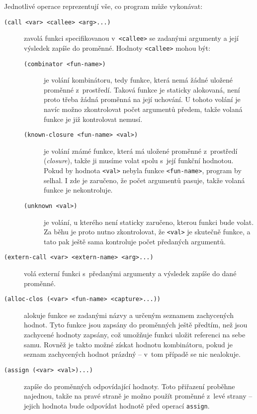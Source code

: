 Jednotlivé operace reprezentují vše, co program může vykonávat:

\begin{description}
  \item[\texttt{(call <var> <callee> <arg>...)}] zavolá funkci specifikovanou
    v~\texttt{<callee>} se zadanými argumenty a její výsledek zapíše do proměnné.
    Hodnoty \texttt{<callee>} mohou být:
    \begin{description}
      \item[\texttt{(combinator <fun-name>)}] je volání kombinátoru, tedy
        funkce, která nemá žádné uložené proměnné z~prostředí. Taková funkce je
        staticky alokovaná, není proto třeba žádná proměnná na její uchování.
        U tohoto volání je navíc možno zkontrolovat počet argumentů předem,
        takže volaná funkce je již kontrolovat nemusí.
      \item[\texttt{(known-closure <fun-name> <val>)}] je volání známé funkce,
        která má uložené proměnné z~prostředí (\emph{closure}), takže ji musíme
        volat spolu s~její funkční hodnotou. Pokud by hodnota \texttt{<val>}
        nebyla funkce \texttt{<fun-name>}, program by selhal. I zde je zaručeno,
        že počet argumentů pasuje, takže volaná funkce je nekontroluje.
      \item[\texttt{(unknown <val>)}] je volání, u kterého není staticky
        zaručeno, kterou funkci bude volat. Za běhu je proto nutno zkontrolovat,
        že \texttt{<val>} je skutečně funkce, a tato pak ještě sama kontroluje
        počet předaných argumentů.
    \end{description}

  \item[\texttt{(extern-call <var> <extern-name> <arg>...)}] volá externí
    funkci s~předanými argumenty a výsledek zapíše do dané proměnné.

  \item[\texttt{(alloc-clos (<var> <fun-name> <capture>...))}] alokuje funkce se
    zadanými názvy a určeným seznamem zachycených hodnot. Tyto funkce jsou
    zapsány do proměnných ještě předtím, než jsou zachycené hodnoty zapsány, což
    umožňuje funkci uložit referenci na sebe samu. Rovněž je takto možné získat
    hodnotu kombinátoru, pokud je seznam zachycených hodnot prázdný -- v~tom
    případě se nic nealokuje.

  \item[\texttt{(assign (<var> <val>)...)}] zapíše do proměnných odpovídající
    hodnoty. Toto přiřazení proběhne najednou, takže na pravé straně je možno
    použít proměnné z~levé strany -- jejich hodnota bude odpovídat hodnotě před
    operací \texttt{assign}.
\end{description}

